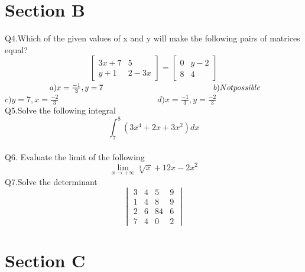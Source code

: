 \documentclass[12pt]{article}
\begin{document}
	\section*{Section B}
	Q4.Which of the given values of x and y will make the following pairs of matrices equal?
	\begin{equation*}
		\begin{bmatrix}3x+7&5\\y+1&2-3x
		\end{bmatrix}=
		\begin{bmatrix}0&y-2\\8&4
		\end{bmatrix}
	\end{equation*}
	\vspace{0.5cm}
	$\hspace{2cm}a)x=\frac{-1}{3},y=7 \hspace{5cm} b)Not possible\newline \hspace*{1.85cm}$
	$ c)y=7,x=\frac{-2}{3} \hspace{5cm} d)x=\frac{-1}{3},y=\frac{-2}{3}$
	\\
	Q5.Solve the following integral
	\begin{equation*}
		\int_{7}^8 (3x^4+2x+3x^2)dx
	\end{equation*}
	\\
	Q6. Evaluate the limit of the following
	\begin{equation*}
		\lim_{x \to +\infty}\sqrt[3]{x}+12x-2x^2
	\end{equation*}
	Q7.Solve the determinant
	\begin{equation*}
		\begin{vmatrix}3&4&5&9\\1&4&8&9\\2&6&84&6\\7&4&0&2
		\end{vmatrix}	
	\end{equation*}
	\section*{Section C}
	
\end{document}
